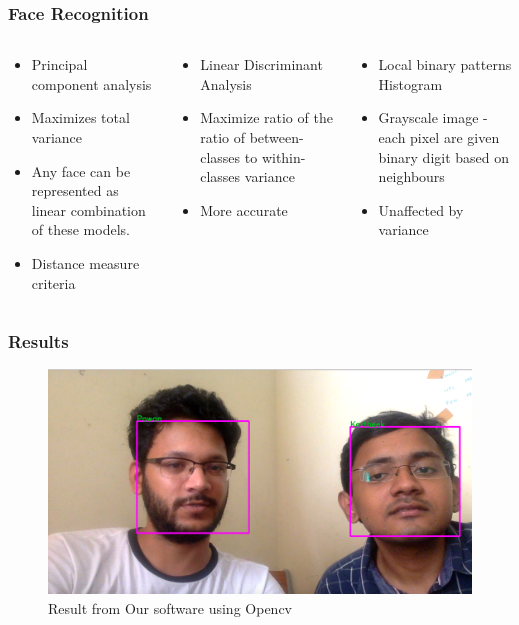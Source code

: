 \documentclass[aspectratio=149]{beamer}
\begin{document}
\begin{frame}
\frametitle{Face Recognition}
\begin{columns}
	\begin{column}{.35\textwidth}
		\begin{itemize}
			\item Principal component analysis
			\item Maximizes total variance
			\item Any face can be represented as linear combination of these models.
			\item Distance measure criteria
		\end{itemize}
	\end{column}
	\begin{column}{.35\textwidth}
		\begin{itemize}
			\item Linear Discriminant Analysis 
			\item Maximize ratio of the ratio of between-classes to within-classes variance
			\item More accurate
		\end{itemize}
	\end{column}
	\begin{column}{.35\textwidth}
		\begin{itemize}
			\item Local binary patterns Histogram
			\item Grayscale image - each pixel are given binary digit based on neighbours 
			\item Unaffected by variance
		\end{itemize}
	\end{column}
\end{columns} 

\end{frame}


\begin{frame}
\frametitle{Results}
\begin{figure}
	\centering
	\includegraphics[scale=0.25]{./images/res.png}
	\caption{Result from Our software using Opencv}
\end{figure}
\end{frame}
\end{document}
